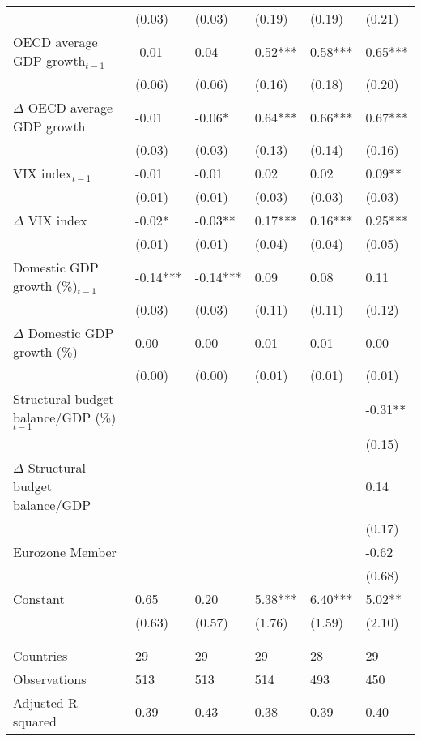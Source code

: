 {\begin{tabular}{lp{2cm}p{2cm}p{2cm}p{2cm}p{2cm}}
   & (0.03) & (0.03) & (0.19) & (0.19) & (0.21) \\ 
  OECD average GDP growth$_{t-1}$ & -0.01 & 0.04 & 0.52*** & 0.58*** & 0.65*** \\ 
   & (0.06) & (0.06) & (0.16) & (0.18) & (0.20) \\ 
  $\Delta$ OECD average GDP growth & -0.01 & -0.06* & 0.64*** & 0.66*** & 0.67*** \\ 
   & (0.03) & (0.03) & (0.13) & (0.14) & (0.16) \\ 
  VIX index$_{t-1}$ & -0.01 & -0.01 & 0.02 & 0.02 & 0.09** \\ 
   & (0.01) & (0.01) & (0.03) & (0.03) & (0.03) \\ 
  $\Delta$ VIX index & -0.02* & -0.03** & 0.17*** & 0.16*** & 0.25*** \\ 
   & (0.01) & (0.01) & (0.04) & (0.04) & (0.05) \\ 
  Domestic GDP growth (\%)$_{t-1}$ & -0.14*** & -0.14*** & 0.09 & 0.08 & 0.11 \\ 
   & (0.03) & (0.03) & (0.11) & (0.11) & (0.12) \\ 
  $\Delta$ Domestic GDP growth (\%) & 0.00 & 0.00 & 0.01 & 0.01 & 0.00 \\ 
   & (0.00) & (0.00) & (0.01) & (0.01) & (0.01) \\ 
  Structural budget balance/GDP (\%)$_{t-1}$ &  &  &  &  & -0.31** \\ 
   &  &  &  &  & (0.15) \\ 
  $\Delta$ Structural budget balance/GDP &  &  &  &  & 0.14 \\ 
   &  &  &  &  & (0.17) \\ 
  Eurozone Member &  &  &  &  & -0.62 \\ 
   &  &  &  &  & (0.68) \\ 
  Constant & 0.65 & 0.20 & 5.38*** & 6.40*** & 5.02** \\ 
   & (0.63) & (0.57) & (1.76) & (1.59) & (2.10) \\ 
   &  &  &  &  &  \\ 
   &  &  &  &  &  \\ 
  Countries & 29 & 29 & 29 & 28 & 29 \\ 
  Observations & 513 & 513 & 514 & 493 & 450 \\ 
  Adjusted R-squared & 0.39 & 0.43 & 0.38 & 0.39 & 0.40 \\ 
   \hline
\end{tabular}
}
